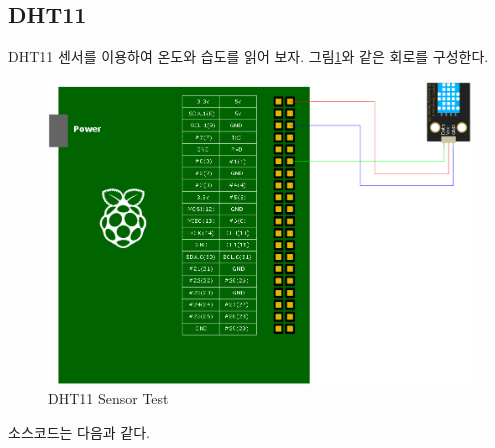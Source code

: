 \documentclass[11pt
  , a4paper
  , article
  , oneside
]{memoir}
\begin{document}
\subsection{DHT11}
DHT11 센서를 이용하여 온도와 습도를 읽어 보자. 그림\ref{fig:dht11_test}와 같은 회로를 구성한다.
\begin{figure}[!htb]
\centering
\includegraphics[width=1\textwidth]{./images/raspberry/dht11test.png}
\caption{DHT11 Sensor Test}
\label{fig:dht11_test}
\end{figure}
소스코드는 다음과 같다.
\end{document}
